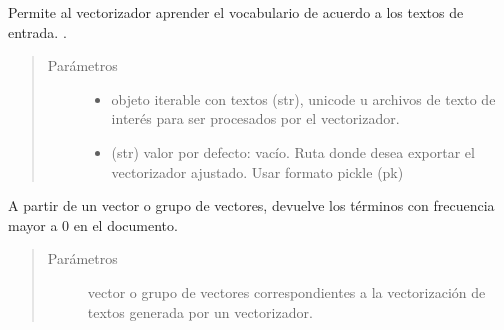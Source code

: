 \documentclass[letterpaper,10pt,openany,spanish]{sphinxmanual}
\begin{document}
\begin{fulllineitems}
\begin{fulllineitems}
\begin{quote}
\begin{description}
\begin{itemize}
\end{itemize}

\end{description}\end{quote}

\end{fulllineitems}


\begin{fulllineitems}
\label{\detokenize{funciones/vectorizacion:vectorizacion.VectorizadorFrecuencias.fit}}
Permite al vectorizador aprender el vocabulario de acuerdo a 
los textos de entrada. .
\begin{quote}\begin{description}
\item[{Parámetros}] \leavevmode\begin{itemize}
\item {} 
 \textendash{} objeto iterable con textos (str), unicode u archivos de 
texto de interés para ser procesados por el vectorizador.

\item {} 
 \textendash{} (str) valor por defecto: vacío. Ruta donde 
desea exportar el vectorizador ajustado. Usar formato pickle (pk)

\end{itemize}

\end{description}\end{quote}

\end{fulllineitems}


\begin{fulllineitems}
\label{\detokenize{funciones/vectorizacion:vectorizacion.VectorizadorFrecuencias.inversa}}
A partir de un vector o grupo de vectores, devuelve los términos 
con frecuencia mayor a 0 en el documento.
\begin{quote}\begin{description}
\item[{Parámetros}] \leavevmode
{} \textendash{} vector o grupo de vectores correspondientes a la 
vectorización de textos generada por un vectorizador.


\end{description}
\end{quote}
\end{fulllineitems}
\end{fulllineitems}
\end{document}
